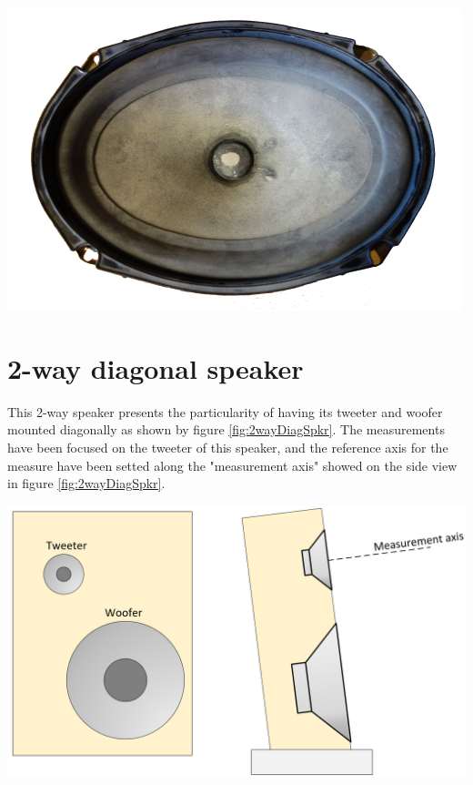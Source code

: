 \documentclass{report}
\begin{document}
\begin{appendices}
\begin{minipage}{0.6\textwidth}
\end{minipage}
\begin{minipage}{0.4\textwidth}
\begin{center}
	\includegraphics[scale=1]{Appendix/Oval_Spkr}
    \captionsetup{hypcap=false}
    \label{fig:spkr_lib_Oval}
\end{center}
\end{minipage}


\section{2-way diagonal speaker}
\label{spkrlib:BnO}

\begin{minipage}{0.6\textwidth}
This 2-way speaker presents the particularity of having its tweeter and woofer mounted diagonally as shown by figure \ref{fig:2wayDiagSpkr}. The measurements have been focused on the tweeter of this speaker, and the reference axis for the measure have been setted along the "measurement axis" showed on the side view in figure \ref{fig:2wayDiagSpkr}.

\end{minipage}
\begin{minipage}{0.4\textwidth}
\begin{center}
	\includegraphics[scale=0.2]{Sym/Spkr_BmO}
    \captionsetup{hypcap=false}
    \label{fig:2wayDiagSpkr}
\end{center}
\end{minipage}




\end{appendices}
\end{document}
